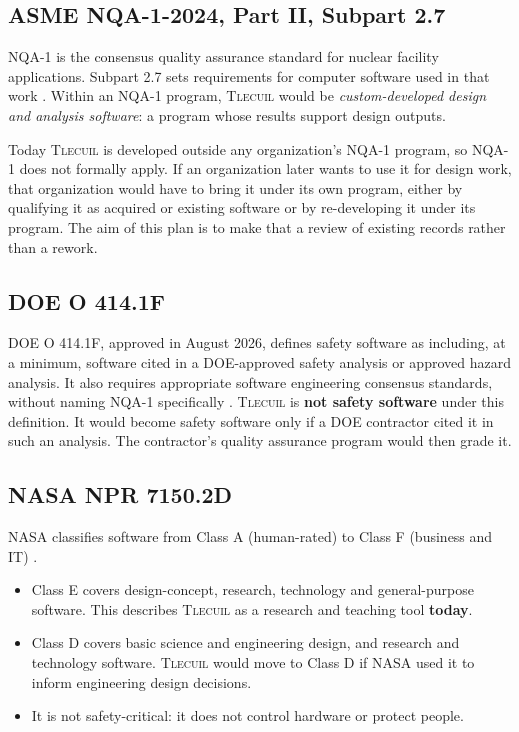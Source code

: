 \documentclass[11pt]{article}
\newcommand{\tlecuil}{\textsc{Tlecuil}}
\begin{document}
\subsection{ASME NQA-1-2024, Part II, Subpart 2.7}
NQA-1 is the consensus quality assurance standard for nuclear facility applications.
Subpart 2.7 sets requirements for computer software used in that work
\cite{nqa1_2024}. Within an NQA-1 program, \tlecuil{} would be \emph{custom-developed
design and analysis software}: a program whose results support design outputs.

Today \tlecuil{} is developed outside any organization's NQA-1 program, so NQA-1 does not
formally apply. If an organization later wants to use it for design work, that
organization would have to bring it under its own program, either by qualifying it as
acquired or existing software or by re-developing it under its program. The aim of
this plan is to make that a review of existing records rather than a rework.

\subsection{DOE O 414.1F}
DOE O 414.1F, approved in August 2026, defines safety software as including, at a
minimum, software cited in a DOE-approved safety analysis or approved hazard analysis.
It also requires appropriate software engineering consensus standards, without naming
NQA-1 specifically \cite{doe4141f}. \tlecuil{} is \textbf{not safety software} under this
definition. It would become safety software only if a DOE contractor cited it in such an
analysis. The contractor's quality assurance program would then grade it.

\subsection{NASA NPR 7150.2D}
NASA classifies software from Class A (human-rated) to Class F (business and IT)
\cite{npr7150_2d}.
\begin{itemize}
  \item Class E covers design-concept, research, technology and general-purpose software.
        This describes \tlecuil{} as a research and teaching tool \textbf{today}.
  \item Class D covers basic science and engineering design, and research and technology
        software. \tlecuil{} would move to Class D if NASA used it to inform engineering
        design decisions.
  \item It is not safety-critical: it does not control hardware or protect people.
\end{itemize}
\end{document}
